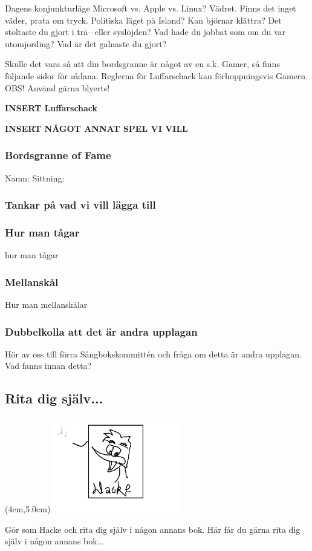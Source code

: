     Dagens konjunkturläge
    Microsoft vs. Apple vs. Linux?
    Vädret. Finns det inget väder, prata om tryck.
    Politiska läget på Island?
    Kan björnar klättra?
    Det stoltaste du gjort i trä– eller syslöjden?
    Vad hade du jobbat som om du var utomjording?
    Vad är det galnaste du gjort?

Skulle det vara så att din bordsgranne är något av en s.k. Gamer, så finns följande sidor för sådana.
Reglerna för Luffarschack kan förhoppningsvis Gamern.
OBS! Använd gärna blyerts!

\newpage


\textbf{INSERT Luffarschack}

\textbf{INSERT NÅGOT ANNAT SPEL VI VILL}

\newpage

\subsubsection*{Bordsgranne of Fame}
Namn:                                          Sittning: 




\newpage

\subsubsection*{Tankar på vad vi vill lägga till}

\subsubsection*{Hur man tågar}
hur man tågar

\subsubsection*{Mellanskål}
Hur man mellanskålar

\subsubsection*{Dubbelkolla att det är andra upplagan}
Hör av oss till förra Sångbokskommittén och fråga om detta är andra upplagan. Vad fanns innan detta?


\newpage
\subsection{Rita dig själv...}

\begin{textblock*}{6cm}(4cm,5.0cm) %
  \includegraphics[width=5.5cm]{./bilder/Untitled.png} %
\end{textblock*}

Gör som Hacke och rita dig själv i någon annans bok.
Här får du gärna rita dig själv i någon annans bok...




